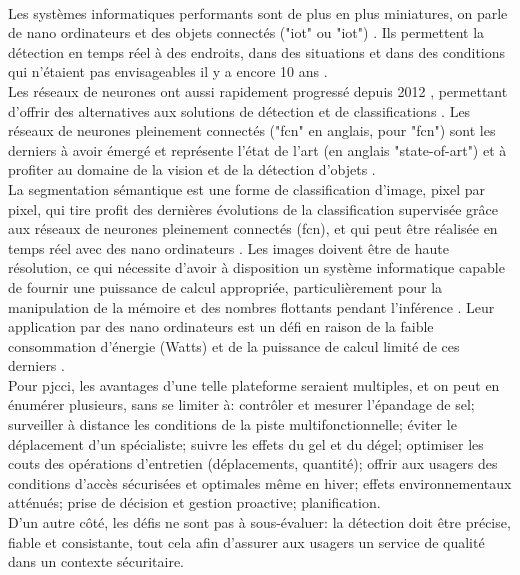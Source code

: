 \vspace{\baselineskip}
\\
\noindent Les systèmes informatiques performants sont de plus en plus miniatures, on parle de nano ordinateurs et des objets connectés ("\acrlong{iot}" ou "\acrshort{iot}") \parencite{blanco-filgueira_deep_2019, sharma_history_2019}. Ils permettent la détection en temps réel à des endroits, dans des situations et dans des conditions qui n'étaient pas envisageables il y a encore 10 ans \parencite{zheng_real-time_2020, bernas_edge_2017, abouzahir_iot-empowered_2017, blanco-filgueira_deep_2019}.
\vspace{\baselineskip}
\\
\noindent Les réseaux de neurones ont aussi rapidement progressé depuis 2012 \parencite{beam_deep_2017}, permettant d'offrir des alternatives aux solutions de détection et de classifications \parencite{pathak_architecturally_2019}. Les réseaux de neurones pleinement connectés ("\acrshort{fcn}" en anglais, pour "\acrlong{fcn}") sont les derniers à avoir émergé et représente l'état de l'art (en anglais "state-of-art") \parencite{zheng_real-time_2020} et à profiter au domaine de la vision et de la détection d'objets \parencite{nguyen_mavnet_2019, zheng_real-time_2020}.
\vspace{\baselineskip}
\\
\noindent La segmentation sémantique est une forme de classification d'image, pixel par pixel, qui tire profit des dernières évolutions de la classification supervisée grâce aux réseaux de neurones pleinement connectés (\acrshort{fcn}), et qui peut être réalisée en temps réel avec des nano ordinateurs \parencite{long_fully_2015, blanco-filgueira_deep_2019}. Les images doivent être de haute résolution, ce qui nécessite d'avoir à disposition un système informatique capable de fournir une puissance de calcul appropriée, particulièrement pour la manipulation de la mémoire et des nombres flottants pendant l'inférence \parencite{mody_low_2018}. Leur application par des nano ordinateurs est un défi en raison de la faible consommation d'énergie (Watts) et de la puissance de calcul limité de ces derniers \parencite{copel_whats_2016}.
\vspace{\baselineskip}
\\
\noindent Pour \acrshort{pjcci}, les avantages d'une telle plateforme seraient multiples, et on peut en énumérer plusieurs, sans se limiter à: contrôler et mesurer l'épandage de sel; surveiller à distance les conditions de la piste multifonctionnelle; éviter le déplacement d'un spécialiste; suivre les effets du gel et du dégel; optimiser les couts des opérations d'entretien (déplacements, quantité); offrir aux usagers des conditions d'accès sécurisées et optimales même en hiver; effets environnementaux atténués; prise de décision et gestion proactive; planification.
\vspace{\baselineskip}
\\
\noindent D'un autre côté, les défis ne sont pas à sous-évaluer: la détection doit être précise, fiable et consistante, tout cela afin d'assurer aux usagers un service de qualité dans un contexte sécuritaire.